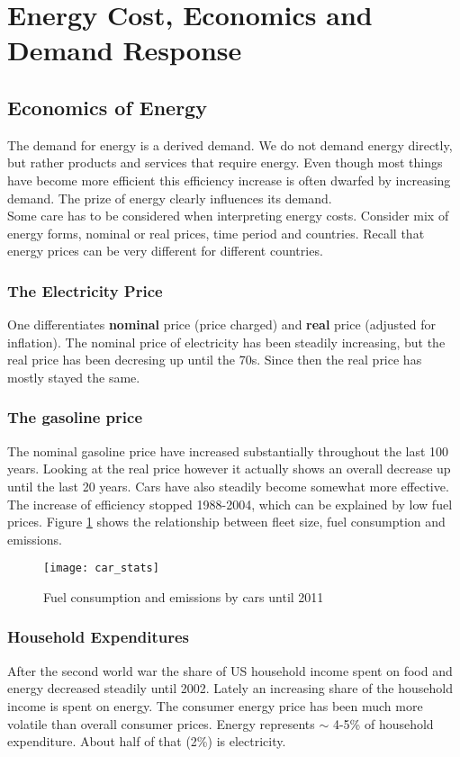 \section{Energy Cost, Economics and Demand Response}

\subsection{Economics of Energy}
The demand for energy is a derived demand.
We do not demand energy directly, but rather products and services that require energy.
Even though most things have become more efficient this efficiency increase is often dwarfed by increasing demand.
The prize of energy clearly influences its demand.\\

Some care has to be considered when interpreting energy costs.
Consider mix of energy forms, nominal or real prices, time period and countries.
Recall that energy prices can be very different for different countries.

\subsubsection{The Electricity Price}
One differentiates \textbf{nominal} price (price charged) and \textbf{real} price (adjusted for inflation).
The nominal price of electricity has been steadily increasing, but the real price has been decresing up until the 70s.
Since then the real price has mostly stayed the same.

\subsubsection{The gasoline price}
The nominal gasoline price have increased substantially throughout the last 100 years.
Looking at the real price however it actually shows an overall decrease up until the last 20 years.
Cars have also steadily become somewhat more effective.
The increase of efficiency stopped 1988-2004, which can be explained by low fuel prices.
Figure \ref{fig:car_stats} shows the relationship between fleet size, fuel consumption and \cotwo emissions.

\begin{figure}
    \centering
    \texttt{[image: car\_stats]}
    \caption{Fuel consumption and \cotwo emissions by cars until 2011}
    \label{fig:car_stats}
\end{figure}

\subsubsection{Household Expenditures}
After the second world war the share of US household income spent on food and energy decreased steadily until 2002.
Lately an increasing share of the household income is spent on energy.
The consumer energy price has been much more volatile than overall consumer prices.
Energy represents $\sim$ 4-5\% of household expenditure.
About half of that (2\%) is electricity.


